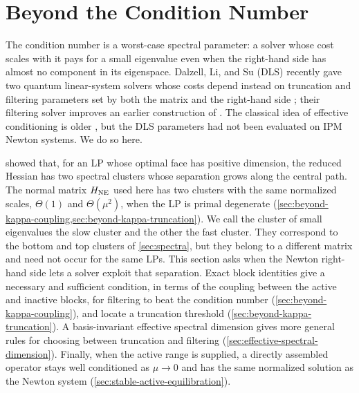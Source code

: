 \section{Beyond the Condition Number}
\label{sec:beyond-kappa}

The condition number is a worst-case spectral parameter: a solver whose
cost scales with it pays for a small eigenvalue even when the right-hand side
has almost no component in its eigenspace.  Dalzell, Li, and Su
(DLS) recently gave two quantum linear-system solvers whose costs depend
instead on truncation and filtering parameters set by both the matrix and
the right-hand side \cite{dalzell2026-faster-quantum-linear-system-solver}; their filtering solver
improves an earlier construction of
\citet{li2025-new-condition-number-application-multivariate-polynomial}.
The classical idea of effective conditioning is older
\cite{chan1988-effectively-well-conditioned-linear-systems}, but the DLS
parameters had not been evaluated on IPM Newton systems.  We do so here.

 showed that, for an LP whose optimal face has positive
dimension, the reduced Hessian has two spectral clusters whose separation
grows along the central path.  The normal matrix $H_{\rm NE}$ used here has
two clusters with the same normalized scales, $\Theta(1)$ and
$\Theta(\mu^2)$, when the LP is primal degenerate
(\cref{sec:beyond-kappa-coupling,sec:beyond-kappa-truncation}).  We call the
cluster of small eigenvalues the slow cluster and the other the fast
cluster.  They correspond to the bottom and top clusters of
\cref{sec:spectra}, but they belong to a different matrix and need not occur
for the same LPs.  This section asks when the Newton right-hand
side lets a solver exploit that separation.  Exact block identities give a
necessary and sufficient condition, in terms of the coupling between the
active and inactive blocks, for filtering to beat the condition number
(\cref{sec:beyond-kappa-coupling}), and locate a truncation threshold
(\cref{sec:beyond-kappa-truncation}).  A basis-invariant effective
spectral dimension gives more general rules for choosing between truncation
and filtering (\cref{sec:effective-spectral-dimension}).  Finally, when the
active range is supplied, a directly assembled operator stays well
conditioned as $\mu\to0$ and has the same normalized solution as the Newton
system (\cref{sec:stable-active-equilibration}).

